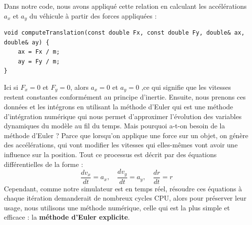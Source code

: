 \documentclass[a4paper,12pt]{report}
\begin{document}
Dans notre code, nous avons appliqué cette relation en calculant les accélérations $a_x$ et $a_y$ du véhicule à partir des forces appliquées :


\begin{lstlisting}[style=CStyle]
void computeTranslation(const double Fx, const double Fy, double& ax, double& ay) {
    ax = Fx / m;
    ay = Fy / m;
}

\end{lstlisting}

Ici si $F_x = 0$ et $F_y = 0$, alors $a_x = 0$ et $a_y = 0$ ,ce qui signifie que les vitesses restent constantes conformément au principe d'inertie.
Ensuite, nous prenons ces données et les intégrons en utilisant la méthode d'Euler qui est une méthode d'intégration numérique qui nous permet d'approximer l'évolution des variables dynamiques du modèle au fil du temps.
Mais pourquoi a-t-on besoin de la méthode d'Euler ? Parce que lorsqu'on applique une force sur un objet, on génère des accélérations, qui vont modifier les vitesses qui elles-mêmes vont avoir une influence sur la position. Tout ce processus est décrit par des équations différentielles de la forme :
$$\frac{d v_x}{dt} = a_x, \quad \frac{d v_y}{dt} = a_y, \quad \frac{d r}{dt} = r_{\dot{}}$$
Cependant, comme notre simulateur est en temps réel, résoudre ces équations à chaque itération demanderait de nombreux cycles CPU, alors pour préserver leur usage, nous utilisons une méthode numérique, celle qui est la plus simple et efficace : la \textbf{méthode d'Euler explicite}.
\end{document}
